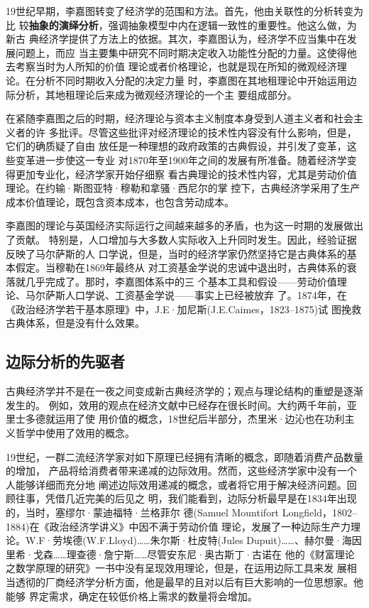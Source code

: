 19世纪早期，李嘉图转变了经济学的范围和方法。首先，他由关联性的分析转变为比
较\textbf{抽象的演绎分析}，强调抽象模型中内在逻辑一致性的重要性。他这么做，为新古
典经济学提供了方法上的依据。其次，李嘉图认为，经济学不应当集中在发展问题上，而应
当主要集中研究不同时期决定收入功能性分配的力量。这使得他去考察当时为人所知的价值
理论或者价格理论，也就是现在所知的微观经济理论。在分析不同时期收入分配的决定力量
时，李嘉图在其地租理论中开始运用边际分析，其地租理论后来成为微观经济理论的一个主
要组成部分。

在紧随李嘉图之后的时期，经济理论与资本主义制度本身受到人道主义者和社会主义者的许
多批评。尽管这些批评对经济理论的技术性内容没有什么影响，但是，它们的确质疑了自由
放任是一种理想的政府政策的古典假设，并引发了变革，这些变革进一步使这一专业
对1870年至1900年之间的发展有所准备。随着经济学变得更加专业化，经济学家开始仔细察
看古典理论的技术性内容，尤其是劳动价值理论。在约输·斯图亚特·穆勒和拿骚·西尼尔的掌
控下，古典经济学采用了生产成本价值理论，既包含资本成本，也包含劳动成本。

李嘉图的理论与英国经济实际运行之间越来越多的矛盾，也为这一时期的发展做出了贡献。
特别是，人口增加与大多数人实际收入上升同时发生。因此，经验证据反映了马尔萨斯的人
口学说，但是，当时的经济学家仍然坚持它是古典体系的基本假定。当穆勒在1869年最终从
对工资基金学说的忠诚中退出时，古典体系的衰落就几乎完成了。那时，李嘉图体系中的三
个基本工具和假设——劳动价值理论、马尔萨斯人口学说、工资基金学说——事实上已经被放弃
了。1874年，在《政治经济学若干基本原理》中，J.E·加尼斯(J.E.Caimes，1823--1875)试
图挽救古典体系，但是没有什么效果。

\subsection{边际分析的先驱者}

古典经济学并不是在一夜之间变成新古典经济学的；观点与理论结构的重塑是逐渐发生的。
例如，效用的观点在经济文献中已经存在很长时间。大约两千年前，亚里士多德就运用了使
用价值的概念，18世纪后半部分，杰里米·边沁也在功利主义哲学中使用了效用的概念。

19世纪，一群二流经济学家对如下原理已经拥有清晰的概念，即随着消费产品数量的增加，
产品将给消费者带来递减的边际效用。然而，这些经济学家中没有一个人能够详细而充分地
阐述边际效用递减的概念，或者将它用于解决经济问题。回顾往事，凭借几近完美的后见之
明，我们能看到，边际分析最早是在1834年出现的，当时，塞缪尔·蒙迪福特·兰格菲尔
德(Samuel Mountifort Longfield，1802--1884)在《政治经济学讲义》中因不满于劳动价值
理论，发展了一种边际生产力理论。W.F·劳埃德(W.F.Lloyd)……朱尔斯·杜皮特(Jules
Dupuit)……、赫尔曼·海因里希·戈森……理查德·詹宁斯……尽管安东尼·奥古斯丁·古诺在
他的《财富理论之数学原理的研究》一书中没有呈现效用理论，但是，在运用边际工具来发
展相当透彻的厂商经济学分析方面，他是最早的且对以后有巨大影响的一位思想家。他能够
界定需求，确定在较低价格上需求的数量将会增加。

